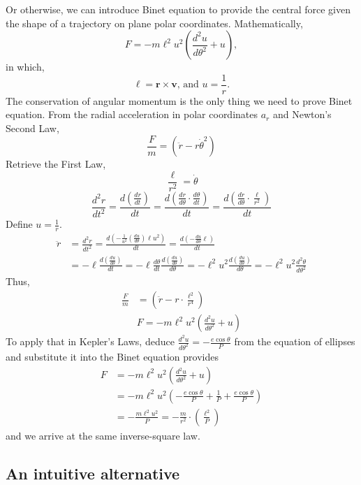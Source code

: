 \documentclass{article}
\begin{document}
Or otherwise, we can introduce Binet equation to provide the central force given the shape of a trajectory on plane polar coordinates. Mathematically, 
\[F = -m \ell ^2 u^2 \left(\frac{d^2u}{d\theta^2} + u \right),\]
in which,
\[\ell = \boldsymbol{r} \times \boldsymbol{v} \text{, and } u = \frac{1}{r}.\]
The conservation of angular momentum is the only thing we need to prove Binet equation. From the radial acceleration in polar coordinates $a_{r}$ and Newton's Second Law,
\begin{equation*}
    \frac{F}{m} =\left(\ddot{r}-r \dot{\theta}^{2}\right)
\end{equation*}
Retrieve the First Law,
\[\frac{\ell}{r^2} = \dot \theta\]
\[\frac{d^2r}{dt^2} = \frac{d(\frac{dr}{dt})}{dt} = \frac{d(\frac{dr}{d\theta} \cdot \frac{d\theta}{dt})}{dt} = \frac{d(\frac{dr}{d\theta} \cdot \frac{\ell}{r^2})}{dt}\]
Define $u = \frac{1}{r}$.
\begin{align}
\ddot r & =\frac{d^2r}{dt^2} = \frac{d\left(-\frac{1}{u^2}\left(\frac{d u}{d \theta}\right) \ell u^2\right)}{d t}=\frac{d\left(-\frac{d u}{d \theta} \ell\right)}{d t} 
\\ & =-\ell \frac{d\left(\frac{d u}{d \theta}\right)}{d t}=-\ell \frac{d \theta}{d t} \frac{d\left(\frac{d u}{d \theta}\right)}{d \theta}=-\ell^2 u^2 \frac{d\left(\frac{d u}{d \theta}\right)}{d \theta}=-\ell^2 u^2 \frac{d^2 \theta}{d \theta^2}
\end{align}
Thus,
\begin{align*}
    \frac{F}{m} & = \left(\ddot{r}-r \cdot \frac{\ell ^2}{r^4}\right)
    \\ & F = -m \ell ^2 u^2 \left(\frac{d^2u}{d\theta^2} + u\right)
\end{align*}
To apply that in Kepler's Laws, deduce $\frac{d^2 u}{d\theta^2} = -\frac{e\cos{\theta}}{P}$ from the equation of ellipses and substitute it into the Binet equation provides
\begin{align*}
    F & =  -m \ell ^2 u^2 \left(\frac{d^2u}{d\theta^2} + u\right)
    \\ & = -m \ell ^2 u^2 \left( -\frac{e\cos{\theta}}{P}+\frac{1}{P} + \frac{e\cos{\theta}}{P} \right)
    \\ & = -\frac{m\ell ^2 u^2}{P} = -\frac{m}{r^2} \cdot \left( \frac{\ell^2}{P} \right)
\end{align*}
and we arrive at the same inverse-square law.

\subsection{An intuitive alternative}
\end{document}
